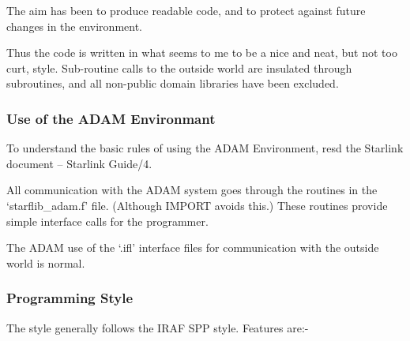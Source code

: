 The aim has been to produce readable code, and to protect against
future changes in the environment.

Thus the code is written in what seems to me to be a nice and neat, but
not too curt, style. Sub-routine calls to the outside world are
insulated through subroutines, and all non-public domain libraries have
been excluded.

\subsubsection{Use of the ADAM Environmant}

To understand the basic rules of using the ADAM Environment, resd the
Starlink document -- Starlink Guide/4.

All communication with the ADAM system goes through the routines in the
`starflib\_adam.f' file. (Although IMPORT avoids this.) These routines
provide simple interface calls for the programmer.

The ADAM use of the `.ifl' interface files for communication with the
outside world is normal.

\subsubsection{Programming Style}

The style generally follows the IRAF SPP style. Features are:-

